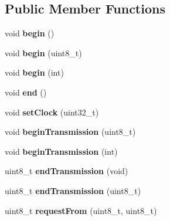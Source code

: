 \subsection*{Public Member Functions}
\begin{DoxyCompactItemize}
\item 
void {\bfseries begin} ()\hypertarget{class_two_wire_ada85a7a8663ec8af0a1248b659be2f18}{}\label{class_two_wire_ada85a7a8663ec8af0a1248b659be2f18}

\item 
void {\bfseries begin} (uint8\+\_\+t)\hypertarget{class_two_wire_a28bca087ed188781ef15e72622d3b1fb}{}\label{class_two_wire_a28bca087ed188781ef15e72622d3b1fb}

\item 
void {\bfseries begin} (int)\hypertarget{class_two_wire_a2806aa5684d36d7d20bf7c51cab3e602}{}\label{class_two_wire_a2806aa5684d36d7d20bf7c51cab3e602}

\item 
void {\bfseries end} ()\hypertarget{class_two_wire_a13cca813f6dd0201ac70178b18ba0946}{}\label{class_two_wire_a13cca813f6dd0201ac70178b18ba0946}

\item 
void {\bfseries set\+Clock} (uint32\+\_\+t)\hypertarget{class_two_wire_a3c4aaae8779a8c34d8a1a90ff317d982}{}\label{class_two_wire_a3c4aaae8779a8c34d8a1a90ff317d982}

\item 
void {\bfseries begin\+Transmission} (uint8\+\_\+t)\hypertarget{class_two_wire_a8d55f00ea8ac3d7427d62e0c71e95ec2}{}\label{class_two_wire_a8d55f00ea8ac3d7427d62e0c71e95ec2}

\item 
void {\bfseries begin\+Transmission} (int)\hypertarget{class_two_wire_a4da95eb4adced5dad152344243e57aad}{}\label{class_two_wire_a4da95eb4adced5dad152344243e57aad}

\item 
uint8\+\_\+t {\bfseries end\+Transmission} (void)\hypertarget{class_two_wire_af80f9a7b85a3a81a035ca94c95bcdc1d}{}\label{class_two_wire_af80f9a7b85a3a81a035ca94c95bcdc1d}

\item 
uint8\+\_\+t {\bfseries end\+Transmission} (uint8\+\_\+t)\hypertarget{class_two_wire_a289f5ef9bb0f79b31095fd72402ed54a}{}\label{class_two_wire_a289f5ef9bb0f79b31095fd72402ed54a}

\item 
uint8\+\_\+t {\bfseries request\+From} (uint8\+\_\+t, uint8\+\_\+t)\hypertarget{class_two_wire_ae27d0936487551a05a1e9901bc456599}{}\label{class_two_wire_ae27d0936487551a05a1e9901bc456599}


\end{DoxyCompactItemize}
